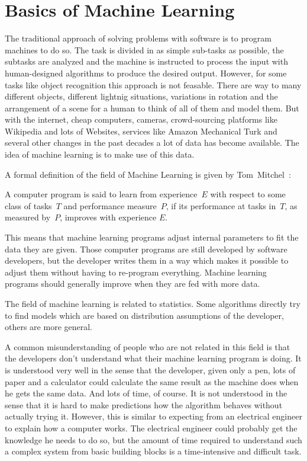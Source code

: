
\section{Basics of Machine Learning}
\label{sec:ml-basics}
The traditional approach of solving problems with software is to program
machines to do so. The task is divided in as simple sub-tasks as possible,
the subtasks are analyzed and the machine is instructed to process the input
with human-designed algorithms to produce the desired output. However, for
some tasks like object recognition this approach is not feasable. There are
way to many different objects, different lightnig situations, variations in
rotation and the arrangement of a scene for a human to think of all of them and
model them. But with the internet, cheap computers, cameras, crowd-sourcing
platforms like Wikipedia and lots of Websites, services like Amazon Mechanical
Turk and several other changes in the past decades a lot of data has become
available. The idea of machine learning is to make use of this data.

A formal definition of the field of Machine Learning is given by
Tom~Mitchel~\cite{Mitchell97}:
\begin{displayquote}
A computer program is said to learn from experience~$E$ with respect to some
class of tasks~$T$ and performance measure~$P$, if its performance at tasks
in~$T$, as measured by~$P$, improves with experience $E$.
\end{displayquote}

This means that machine learning programs adjust internal parameters to fit the
data they are given. Those computer programs are still developed by software
developers, but the developer writes them in a way which makes it possible to
adjust them without having to re-program everything. Machine learning programs
should generally improve when they are fed with more data.

The field of machine learning is related to statistics. Some algorithms
directly try to find models which are based on distribution assumptions of the
developer, others are more general.

A common misunderstanding of people who are not related in this field is that
the developers don't understand what their machine learning program is doing.
It is understood very well in the sense that the developer, given only a pen,
lots of paper and a calculator could calculate the same result as the machine
does when he gets the same data. And lots of time, of course. It is not
understood in the sense that it is hard to make predictions how the algorithm
behaves without actually trying it. However, this is similar to expecting from
an electrical engineer to explain how a computer works. The electrical engineer
could probably get the knowledge he needs to do so, but the amount of time
required to understand such a complex system from basic building blocks is
a time-intensive and difficult task.

